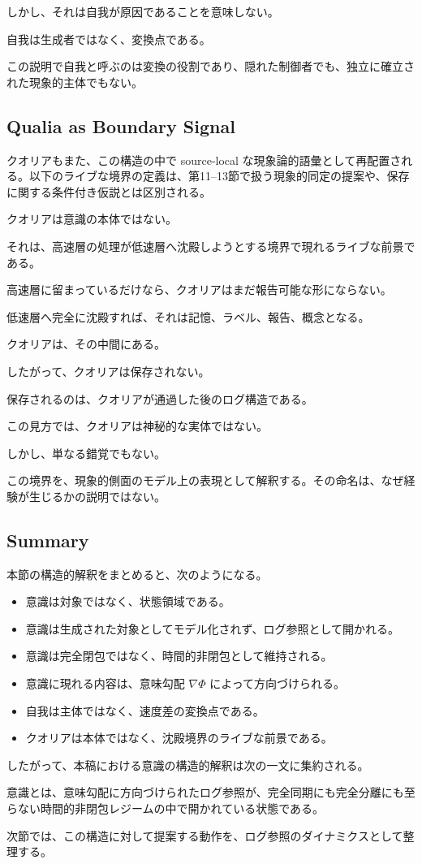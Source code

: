 しかし、それは自我が原因であることを意味しない。

自我は生成者ではなく、変換点である。

この説明で自我と呼ぶのは変換の役割であり、隠れた制御者でも、独立に確立された現象的主体でもない。

\subsection{Qualia as Boundary Signal}

クオリアもまた、この構造の中で source-local な現象論的語彙として再配置される。以下のライブな境界の定義は、第11--13節で扱う現象的同定の提案や、保存に関する条件付き仮説とは区別される。

クオリアは意識の本体ではない。

それは、高速層の処理が低速層へ沈殿しようとする境界で現れるライブな前景である。

高速層に留まっているだけなら、クオリアはまだ報告可能な形にならない。

低速層へ完全に沈殿すれば、それは記憶、ラベル、報告、概念となる。

クオリアは、その中間にある。

したがって、クオリアは保存されない。

保存されるのは、クオリアが通過した後のログ構造である。

この見方では、クオリアは神秘的な実体ではない。

しかし、単なる錯覚でもない。

この境界を、現象的側面のモデル上の表現として解釈する。その命名は、なぜ経験が生じるかの説明ではない。

\subsection{Summary}

本節の構造的解釈をまとめると、次のようになる。

\begin{itemize}
\item 意識は対象ではなく、状態領域である。
\item 意識は生成された対象としてモデル化されず、ログ参照として開かれる。
\item 意識は完全閉包ではなく、時間的非閉包として維持される。
\item 意識に現れる内容は、意味勾配 $\nabla \Phi$ によって方向づけられる。
\item 自我は主体ではなく、速度差の変換点である。
\item クオリアは本体ではなく、沈殿境界のライブな前景である。
\end{itemize}

したがって、本稿における意識の構造的解釈は次の一文に集約される。

意識とは、意味勾配に方向づけられたログ参照が、完全同期にも完全分離にも至らない時間的非閉包レジームの中で開かれている状態である。

次節では、この構造に対して提案する動作を、ログ参照のダイナミクスとして整理する。
